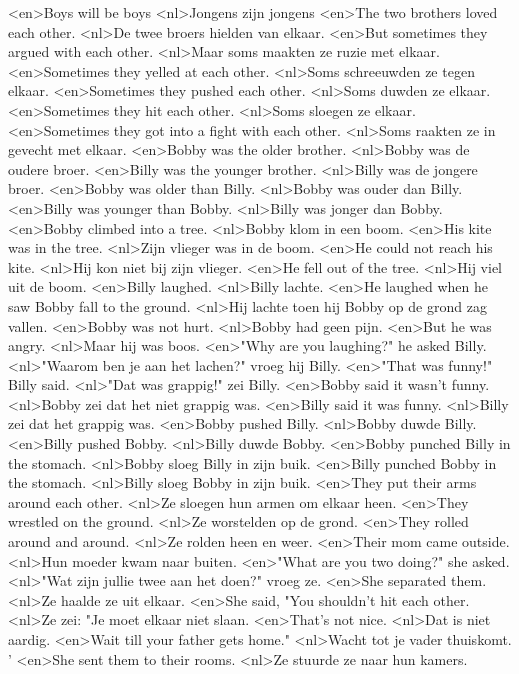 <en>Boys will be boys
<nl>Jongens zijn jongens
<en>The two brothers loved each other.
<nl>De twee broers hielden van elkaar.
<en>But sometimes they argued with each other.
<nl>Maar soms maakten ze ruzie met elkaar.
<en>Sometimes they yelled at each other.
<nl>Soms schreeuwden ze tegen elkaar.
<en>Sometimes they pushed each other.
<nl>Soms duwden ze elkaar.
<en>Sometimes they hit each other.
<nl>Soms sloegen ze elkaar.
<en>Sometimes they got into a fight with each other.
<nl>Soms raakten ze in gevecht met elkaar.
<en>Bobby was the older brother.
<nl>Bobby was de oudere broer.
<en>Billy was the younger brother.
<nl>Billy was de jongere broer.
<en>Bobby was older than Billy.
<nl>Bobby was ouder dan Billy.
<en>Billy was younger than Bobby.
<nl>Billy was jonger dan Bobby.
<en>Bobby climbed into a tree.
<nl>Bobby klom in een boom.
<en>His kite was in the tree.
<nl>Zijn vlieger was in de boom.
<en>He could not reach his kite.
<nl>Hij kon niet bij zijn vlieger.
<en>He fell out of the tree.
<nl>Hij viel uit de boom.
<en>Billy laughed.
<nl>Billy lachte.
<en>He laughed when he saw Bobby fall to the ground.
<nl>Hij lachte toen hij Bobby op de grond zag vallen.
<en>Bobby was not hurt.
<nl>Bobby had geen pijn.
<en>But he was angry.
<nl>Maar hij was boos.
<en>"Why are you laughing?" he asked Billy.
<nl>"Waarom ben je aan het lachen?" vroeg hij Billy.
<en>"That was funny!" Billy said.
<nl>"Dat was grappig!" zei Billy.
<en>Bobby said it wasn't funny.
<nl>Bobby zei dat het niet grappig was.
<en>Billy said it was funny.
<nl>Billy zei dat het grappig was.
<en>Bobby pushed Billy.
<nl>Bobby duwde Billy.
<en>Billy pushed Bobby.
<nl>Billy duwde Bobby.
<en>Bobby punched Billy in the stomach.
<nl>Bobby sloeg Billy in zijn buik.
<en>Billy punched Bobby in the stomach.
<nl>Billy sloeg Bobby in zijn buik.
<en>They put their arms around each other.
<nl>Ze sloegen hun armen om elkaar heen.
<en>They wrestled on the ground.
<nl>Ze worstelden op de grond.
<en>They rolled around and around.
<nl>Ze rolden heen en weer.
<en>Their mom came outside.
<nl>Hun moeder kwam naar buiten.
<en>"What are you two doing?" she asked.
<nl>"Wat zijn jullie twee aan het doen?" vroeg ze.
<en>She separated them.
<nl>Ze haalde ze uit elkaar.
<en>She said, "You shouldn't hit each other.
<nl>Ze zei: "Je moet elkaar niet slaan.
<en>That's not nice.
<nl>Dat is niet aardig.
<en>Wait till your father gets home."
<nl>Wacht tot je vader thuiskomt. '
<en>She sent them to their rooms.
<nl>Ze stuurde ze naar hun kamers.
